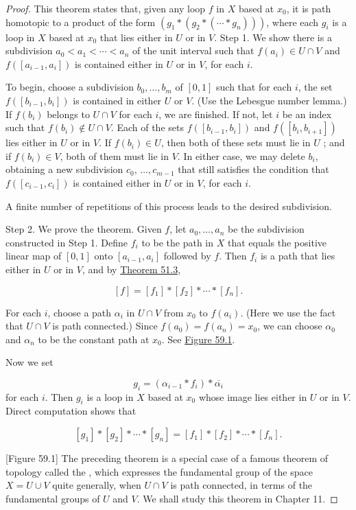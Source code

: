 \begin{proof}
This theorem states that, given any loop \(f\) in \(X\) based at \(x_{0}\), it is path homotopic to a product of the form \(( {g_{1} * ( {g_{2} * ( {\cdots * g_{n}}) }) })\), where each \(g_{i}\) is a loop in \(X\) based at \(x_{0}\) that lies either in \(U\) or in \(V\).
Step 1. We show there is a subdivision \(a_{0} < a_{1} < \cdots < a_{n}\) of the unit interval such that \(f( a_{i}) \in U \cap V\) and \(f( [ {a_{i - 1},a_{i}}] )\) is contained either in \(U\) or in \(V\), for each \(i\).

To begin, choose a subdivision \(b_{0},\ldots ,b_{m}\) of \([ {0,1}]\) such that for each \(i\), the set \(f( [ {b_{i - 1},b_{i}}] )\) is contained in either \(U\) or \(V\). (Use the Lebesgue number lemma.) If \(f( b_{i})\) belongs to \(U \cap V\) for each \(i\), we are finished. If not, let \(i\) be an index such that \(f( b_{i}) \notin U \cap V\). Each of the sets \(f( [ {b_{i - 1},b_{i}}] )\) and \(f( [ {b_{i},b_{i + 1}}] )\) lies either in \(U\) or in \(V\). If \(f( b_{i}) \in U\), then both of these sets must lie in \(U\) ; and if \(f( b_{i}) \in V\), both of them must lie in \(V\). In either case, we may delete \(b_{i}\), obtaining a new subdivision \(c_{0}\), \(\ldots ,c_{m - 1}\) that still satisfies the condition that \(f( [ {c_{i - 1},c_{i}}] )\) is contained either in \(U\) or in \(V\), for each \(i\).

A finite number of repetitions of this process leads to the desired subdivision.

Step 2. We prove the theorem. Given \(f\), let \(a_{0},\ldots ,a_{n}\) be the subdivision constructed in Step 1. Define \(f_{i}\) to be the path in \(X\) that equals the positive linear map of \([ {0,1}]\) onto \([ {a_{i - 1},a_{i}}]\) followed by \(f\). Then \(f_{i}\) is a path that lies either in \(U\) or in \(V\), and by \hyperref[thm:51.3]{Theorem 51.3},

\[
[ f] = [ f_{1}] * [ f_{2}] * \cdots * [ f_{n}] .
\]

For each \(i\), choose a path \({\alpha }_{i}\) in \(U \cap V\) from \(x_{0}\) to \(f( a_{i})\). (Here we use the fact that \(U \cap V\) is path connected.) Since \(f( a_{0}) = f( a_{n}) = x_{0}\), we can choose \({\alpha }_{0}\) and \({\alpha }_{n}\) to be the constant path at \(x_{0}\). See \hyperref[fig:59.1]{Figure 59.1}.

Now we set

\[
g_{i} = ( {{\alpha }_{i - 1} * f_{i}}) * \overline{{\alpha }_{i}}
\]
for each \(i\). Then \(g_{i}\) is a loop in \(X\) based at \(x_{0}\) whose image lies either in \(U\) or in \(V\). Direct computation shows that

\[
[ g_{1}] * [ g_{2}] * \cdots * [ g_{n}] = [ f_{1}] * [ f_{2}] * \cdots * [ f_{n}] .
\]

[Figure 59.1]
The preceding theorem is a special case of a famous theorem of topology called the , which expresses the fundamental group of the space \(X = U \cup V\) quite generally, when \(U \cap V\) is path connected, in terms of the fundamental groups of \(U\) and \(V\). We shall study this theorem in Chapter 11.
\end{proof}
